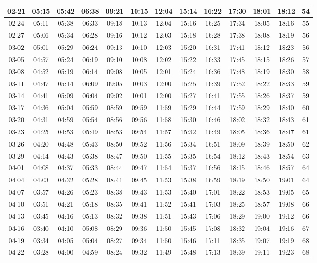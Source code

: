 \begin{footnotesize}
\begin{longtable}{c | c | c | c | c | c | c | c | c | c | c | c | c}
		02-21&05:15&05:42&06:38&09:21&10:15&12:04&15:14&16:22&17:30&18:01&18:12&54\\\hline
		02-24&05:11&05:38&06:33&09:18&10:13&12:04&15:16&16:25&17:34&18:05&18:16&55\\\hline
		02-27&05:06&05:34&06:28&09:16&10:12&12:03&15:18&16:28&17:38&18:08&18:19&56\\\hline
		03-02&05:01&05:29&06:24&09:13&10:10&12:03&15:20&16:31&17:41&18:12&18:23&56\\\hline
		03-05&04:57&05:24&06:19&09:10&10:08&12:02&15:22&16:33&17:45&18:15&18:26&57\\\hline
		03-08&04:52&05:19&06:14&09:08&10:05&12:01&15:24&16:36&17:48&18:19&18:30&58\\\hline
		03-11&04:47&05:14&06:09&09:05&10:03&12:00&15:25&16:39&17:52&18:22&18:33&59\\\hline
		03-14&04:41&05:09&06:04&09:02&10:01&12:00&15:27&16:41&17:55&18:26&18:37&59\\\hline
		03-17&04:36&05:04&05:59&08:59&09:59&11:59&15:29&16:44&17:59&18:29&18:40&60\\\hline
		03-20&04:31&04:59&05:54&08:56&09:56&11:58&15:30&16:46&18:02&18:32&18:43&61\\\hline
		03-23&04:25&04:53&05:49&08:53&09:54&11:57&15:32&16:49&18:05&18:36&18:47&61\\\hline
		03-26&04:20&04:48&05:43&08:50&09:52&11:56&15:34&16:51&18:09&18:39&18:50&62\\\hline
		03-29&04:14&04:43&05:38&08:47&09:50&11:55&15:35&16:54&18:12&18:43&18:54&63\\\hline
		04-01&04:08&04:37&05:33&08:44&09:47&11:54&15:37&16:56&18:15&18:46&18:57&64\\\hline
		04-04&04:03&04:32&05:28&08:41&09:45&11:53&15:38&16:59&18:19&18:50&19:01&64\\\hline
		04-07&03:57&04:26&05:23&08:38&09:43&11:53&15:40&17:01&18:22&18:53&19:05&65\\\hline
		04-10&03:51&04:21&05:18&08:35&09:41&11:52&15:41&17:03&18:25&18:57&19:08&66\\\hline
		04-13&03:45&04:16&05:13&08:32&09:38&11:51&15:43&17:06&18:29&19:00&19:12&66\\\hline
		04-16&03:40&04:10&05:08&08:29&09:36&11:50&15:45&17:08&18:32&19:04&19:16&67\\\hline
		04-19&03:34&04:05&05:04&08:27&09:34&11:50&15:46&17:11&18:35&19:07&19:19&68\\\hline
		04-22&03:28&04:00&04:59&08:24&09:32&11:49&15:48&17:13&18:39&19:11&19:23&68\\\hline

\end{longtable}
\end{footnotesize}
